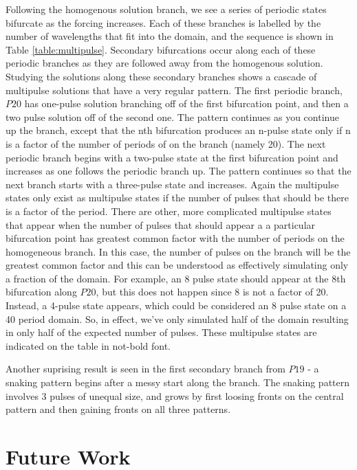 \documentclass[api,pof,pre,12pt,a4paper]{revtex4-1}
\begin{document}
Following the homogenous solution branch, we see a series of periodic states bifurcate as the forcing increases.  Each of these branches is labelled by the number of wavelengths that fit into the domain, and the sequence is shown in Table \ref{table:multipulse}.  Secondary bifurcations occur along each of these periodic branches as they are followed away from the homogenous solution.  Studying the solutions along these secondary branches shows a cascade of multipulse solutions that have a very regular pattern.  The first periodic branch, $P20$ has  one-pulse solution branching off of the first bifurcation point, and then a two pulse solution off of the second one.  The pattern continues as you continue up the branch, except that the nth bifurcation produces an n-pulse state only if n is a factor of the number of periods of  on the branch (namely 20).  The next periodic branch begins with a two-pulse state at the first bifurcation point and increases as one follows the periodic branch up.  The pattern continues so that the next branch starts with a three-pulse state and increases.  Again the multipulse states only exist as multipulse states if the number of pulses that should be there is a factor of the period.  There are other, more complicated multipulse states that appear when the number of pulses that should appear a a particular bifurcation point has greatest common factor with the number of periods on the homogeneous branch.  In this case, the number of pulses on the branch will be the greatest common factor and this can be understood as effectively simulating only a fraction of the domain.  For example, an 8 pulse state should appear at the 8th bifurcation along $P20$, but this does not happen since 8 is not a factor of 20.  Instead, a 4-pulse state appears, which could be considered an 8 pulse state on a 40 period domain.  So, in effect, we've only simulated half of the domain resulting in only half of the expected number of pulses.  These multipulse states are indicated on the table in not-bold font.

Another suprising result is seen in the first secondary branch from $P19$ - a snaking pattern  begins  after a messy start along the branch.  The snaking pattern involves 3 pulses of unequal size, and grows by first loosing fronts on the central pattern and then gaining fronts on all three patterns.

\section{Future Work}



\end{document}
